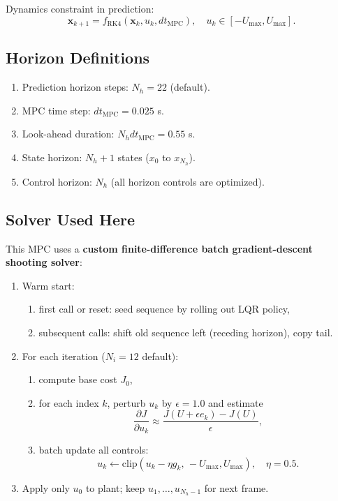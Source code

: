 \documentclass[11pt,a4paper]{article}
\newcommand{\state}{\mathbf{x}}
\begin{document}
Dynamics constraint in prediction:
\begin{equation}
\state_{k+1}=f_{\text{RK4}}(\state_k,u_k,dt_{\text{MPC}}),\quad u_k\in[-U_{\max},U_{\max}].
\end{equation}

\subsection{Horizon Definitions}
\begin{enumerate}[label=\arabic*.]
  \item Prediction horizon steps: $N_h=22$ (default).
  \item MPC time step: $dt_{\text{MPC}}=0.025$ s.
  \item Look-ahead duration: $N_h dt_{\text{MPC}}=0.55$ s.
  \item State horizon: $N_h+1$ states ($x_0$ to $x_{N_h}$).
  \item Control horizon: $N_h$ (all horizon controls are optimized).
\end{enumerate}

\subsection{Solver Used Here}
This MPC uses a \textbf{custom finite-difference batch gradient-descent shooting solver}:
\begin{enumerate}[label=\arabic*.]
  \item Warm start:
  \begin{enumerate}[label*=\arabic*.]
    \item first call or reset: seed sequence by rolling out LQR policy,
    \item subsequent calls: shift old sequence left (receding horizon), copy tail.
  \end{enumerate}
  \item For each iteration ($N_i=12$ default):
  \begin{enumerate}[label*=\arabic*.]
    \item compute base cost $J_0$,
    \item for each index $k$, perturb $u_k$ by $\epsilon=1.0$ and estimate
    \begin{equation}
    \frac{\partial J}{\partial u_k}\approx \frac{J(U+\epsilon e_k)-J(U)}{\epsilon},
    \end{equation}
    \item batch update all controls:
    \begin{equation}
    u_k \leftarrow \text{clip}(u_k - \eta g_k,\,-U_{\max},U_{\max}),\quad \eta=0.5.
    \end{equation}
  \end{enumerate}
  \item Apply only $u_0$ to plant; keep $u_1,\ldots,u_{N_h-1}$ for next frame.
\end{enumerate}
\end{document}
